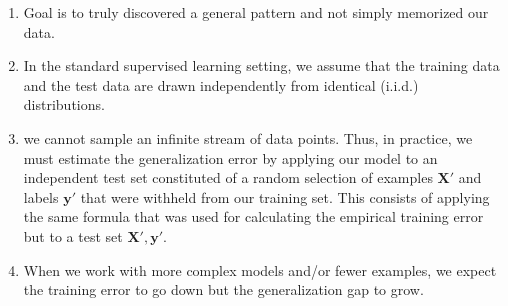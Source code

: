 \begin{enumerate}[itemsep=0.2cm]
    \item Goal is to truly discovered a general pattern and not simply memorized our data.

    \item In the standard supervised learning setting, we assume that the training data and the test data are drawn independently from identical (i.i.d.) distributions.

    \item we cannot sample an infinite stream of data points. Thus, in practice, we must estimate the generalization error by applying our model to an independent test set constituted of a random selection of examples $\mathbf{X}'$ and labels $\mathbf{y}'$  that were withheld from our training set. This consists of applying the same formula that was used for calculating the empirical training error but to a test set $\mathbf{X}', \mathbf{y}'$.

    \item When we work with more complex models and/or fewer examples, we expect the training error to go down but the generalization gap to grow.
\end{enumerate}

































